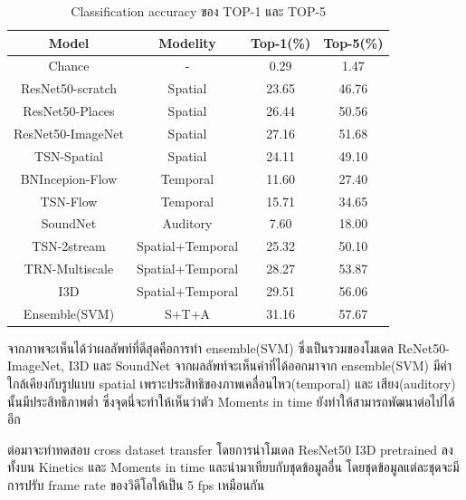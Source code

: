 \begin{table}[!ht]
\centering
\begin{tabular}{|c|c|c|c|}
		\hline
		{Model}&{Modelity}&{Top-1(\%)}&{Top-5(\%)}\\
		\hline
		Chance			& -				& 0.29		& 1.47						\\
		\hline
		ResNet50-scratch	& Spatial			& 23.65		& 46.76						\\
		ResNet50-Places		& Spatial			& 26.44		& 50.56						\\	
		ResNet50-ImageNet	& Spatial			& 27.16		& 51.68						\\
		TSN-Spatial		& Spatial			& 24.11		& 49.10						\\
		\hline
		BNIncepion-Flow		& Temporal		& 11.60		& 27.40						\\
		TSN-Flow			& Temporal		& 15.71		& 34.65						\\
		\hline
		SoundNet			& Auditory			& 7.60		& 18.00						\\
		\hline
		TSN-2stream		& Spatial+Temporal	& 25.32		& 50.10						\\
		TRN-Multiscale		& Spatial+Temporal	& 28.27		& 53.87						\\
		I3D 				& Spatial+Temporal	& 29.51		& 56.06						\\
		\hline
		Ensemble(SVM)		& S+T+A 			& 31.16		& 57.67						\\
		\hline
	\end{tabular}
	\caption{Classification accuracy ของ TOP-1 และ TOP-5}
	\label{tab: Classification accuracy ของ TOP-1 และ TOP-5}
\end{table}

จากภาพจะเห็นได้ว่าผลลัพท์ที่ดีสุดคือการทำ ensemble(SVM) ซึ่งเป็นรวมของโมเดล ReNet50-ImageNet, I3D และ SoundNet จากผลลัพท์จะเห็นค่าที่ได้ออกมาจาก ensemble(SVM)  มีค่าใกล้เคียงกับรูปแบบ spatial เพราะประสิทธิของภาพเคลื่อนไหว(temporal) และ เสียง(auditory) นั้นมีประสิทธิภาพต่ำ ซึ่งจุดนี่จะทำให้เห็นว่าตัว Moments in time ยังทำให้สามารถพัฒนาต่อไปได้อีก
\par
ต่อมาจะทำทดสอบ cross dataset transfer โดยการนำโมเดล ResNet50 I3D pretrained ลงทั้งบน Kinetics และ Moments in time และนำมาเทียบกับชุดข้อมูลอื่น โดยชุดข้อมูลแต่ละชุดจะมีการปรับ frame rate ของวิดีโอให้เป็น 5 fps เหมือนกัน

